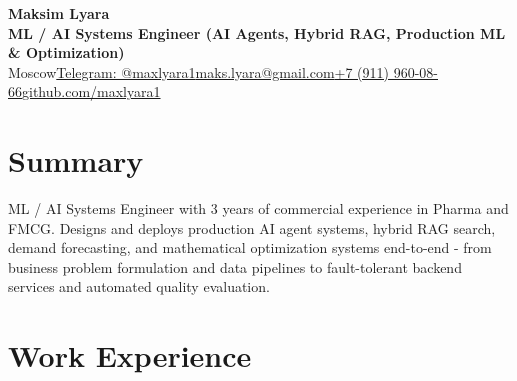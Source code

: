 \documentclass[a4paper,10pt]{article}
\newcommand{\sep}{\hspace{0.45em}\textbar\hspace{0.45em}}
\newcommand{\bodyfont}{\fontsize{9.55pt}{11.65pt}\selectfont}
\begin{document}
\bodyfont

\begin{center}
  {\fontsize{17.8pt}{20.6pt}\selectfont\textbf{Maksim Lyara}}\\[3.0pt]
  {\fontsize{10.25pt}{12.3pt}\selectfont\textbf{\color{accent}ML / AI Systems Engineer (AI Agents, Hybrid RAG, Production ML \& Optimization)}}\\[3.6pt]
  {\fontsize{9.4pt}{11.3pt}\selectfont
    Moscow\sep\href{https://t.me/maxlyara1}{Telegram: @maxlyara1}\sep\href{mailto:maks.lyara@gmail.com}{maks.lyara@gmail.com}\sep\href{tel:+79119600866}{+7 (911) 960-08-66}\sep\href{https://github.com/maxlyara1}{github.com/maxlyara1}
  }
\end{center}
\vspace{-2.5pt}

\section{Summary}
ML / AI Systems Engineer with 3 years of commercial experience in Pharma and FMCG. Designs and deploys production AI agent systems, hybrid RAG search, demand forecasting, and mathematical optimization systems \mbox{end-to-end} - from business problem formulation and data pipelines to \mbox{fault-tolerant} backend services and automated quality evaluation.

\section{Work Experience}
\end{document}
